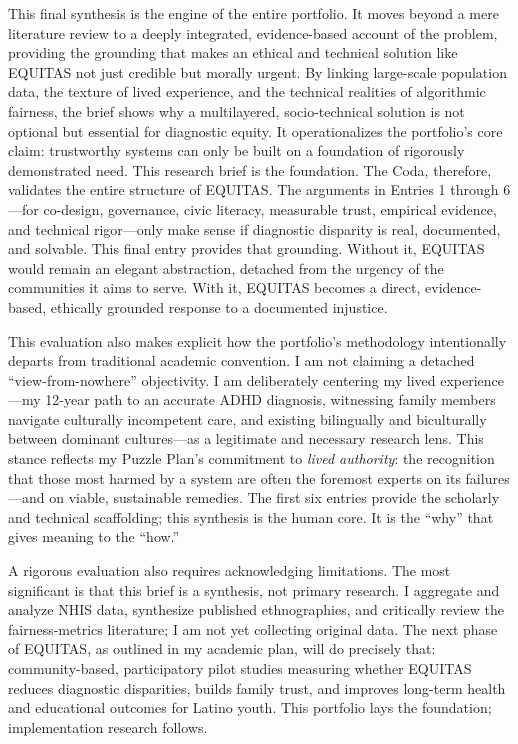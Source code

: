 \documentclass[11pt,twoside]{article}
\begin{document}
This final synthesis is the engine of the entire portfolio. It moves beyond a mere literature review to a deeply integrated, evidence-based account of the problem, providing the grounding that makes an ethical and technical solution like EQUITAS not just credible but morally urgent. By linking large-scale population data, the texture of lived experience, and the technical realities of algorithmic fairness, the brief shows why a multilayered, socio-technical solution is not optional but essential for diagnostic equity. It operationalizes the portfolio’s core claim: trustworthy systems can only be built on a foundation of rigorously demonstrated need. This research brief is the foundation. The Coda, therefore, validates the entire structure of EQUITAS. The arguments in Entries 1 through 6—for co-design, governance, civic literacy, measurable trust, empirical evidence, and technical rigor—only make sense if diagnostic disparity is real, documented, and solvable. This final entry provides that grounding. Without it, EQUITAS would remain an elegant abstraction, detached from the urgency of the communities it aims to serve. With it, EQUITAS becomes a direct, evidence-based, ethically grounded response to a documented injustice.

This evaluation also makes explicit how the portfolio’s methodology intentionally departs from traditional academic convention. I am not claiming a detached “view-from-nowhere” objectivity. I am deliberately centering my lived experience—my 12-year path to an accurate ADHD diagnosis, witnessing family members navigate culturally incompetent care, and existing bilingually and biculturally between dominant cultures—as a legitimate and necessary research lens. This stance reflects my Puzzle Plan’s commitment to \textit{lived authority}: the recognition that those most harmed by a system are often the foremost experts on its failures—and on viable, sustainable remedies. The first six entries provide the scholarly and technical scaffolding; this synthesis is the human core. It is the “why” that gives meaning to the “how.”

A rigorous evaluation also requires acknowledging limitations. The most significant is that this brief is a synthesis, not primary research. I aggregate and analyze NHIS data, synthesize published ethnographies, and critically review the fairness-metrics literature; I am not yet collecting original data. The next phase of EQUITAS, as outlined in my academic plan, will do precisely that: community-based, participatory pilot studies measuring whether EQUITAS reduces diagnostic disparities, builds family trust, and improves long-term health and educational outcomes for Latino youth. This portfolio lays the foundation; implementation research follows.
\end{document}

